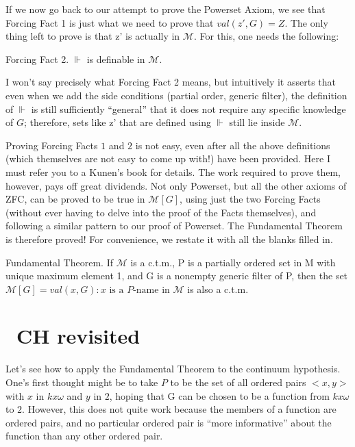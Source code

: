 \documentclass[10pt]{article}
\begin{document}
If we now go back to our attempt to prove the Powerset Axiom, we see that
Forcing Fact 1 is just what we need to prove that $val(z',G) = Z$. The only
thing left to prove is that z' is actually in $\mathcal M$. For this, one needs the
following:

Forcing Fact 2. $\Vdash$ is definable in $\mathcal M$.

I won't say precisely what Forcing Fact 2 means, but intuitively it asserts
that even when we add the side conditions (partial order, generic filter),
the definition of $\Vdash$ is still sufficiently ``general'' that it does not
require any specific knowledge of $G$; therefore, sets like z' that are
defined using $\Vdash$ still lie inside $\mathcal{M}$.

Proving Forcing Facts $1$ and $2$ is not easy, even after all the above definitions (which themselves are not easy to come up with!) have been provided. Here I must refer you to a Kunen's book for details. The work required to prove them, however, pays off great dividends. Not only Powerset, but all the other axioms of ZFC, can be proved to be true in $\mathcal{M}[G]$, using just the two Forcing Facts (without ever having to delve into the proof of the Facts themselves), and following a similar pattern to our proof of Powerset. The Fundamental Theorem is therefore proved! For convenience, we restate it with all the blanks filled in.

Fundamental Theorem. If $\mathcal{M}$ is a c.t.m., P is a partially ordered set in M with unique maximum element 1, and G is a nonempty generic filter of P, then the set $\mathcal{M}[G] = {val(x,G) : x \text{ is a }P\text{-name in }\mathcal M}$ is also a c.t.m.


\section{~CH revisited}

Let's see how to apply the Fundamental Theorem to the continuum hypothesis. One's first thought might be to take $P$ to be the set of all ordered pairs $<x,y>$ with $x$ in $k x \omega$ and $y$ in $2$, hoping that G can be chosen to be a function from $k x \omega$ to $2$. However, this does not quite work because the members of a function are ordered pairs, and no particular ordered pair is ``more informative'' about the function than any other ordered pair.
\end{document}
